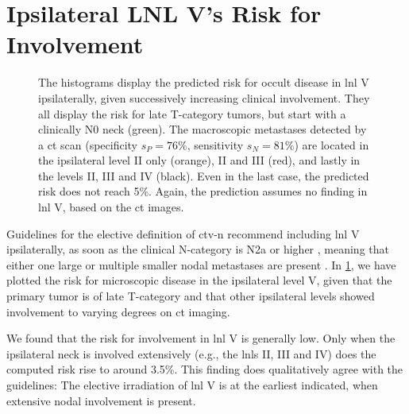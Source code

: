 \documentclass[\relativeRoot/main.tex]{subfiles}
\begin{document}
\section[Ipsilateral LNL V's Risk for Involvement]{Ipsilateral LNL V's Risk for Involvement}
\label{sec:complete:ipsiV}

\begin{figure}
    \centering
    \def\svgwidth{1.0\textwidth}
    
    \caption[
        Computed risks of involvement for ipsilateral LNL V
    ]{
        The histograms display the predicted risk for occult disease in \gls{lnl} V ipsilaterally, given successively increasing clinical involvement. They all display the risk for late T-category tumors, but start with a clinically N0 neck (green). The macroscopic metastases detected by a \gls{ct} scan (specificity $s_P = 76\%$, sensitivity $s_N = 81\%$) are located in the ipsilateral level II only (orange), II and III (red), and lastly in the levels II, III and IV (black). Even in the last case, the predicted risk does not reach 5\%. Again, the prediction assumes no finding in \gls{lnl} V, based on the \gls{ct} images.
    }
    \label{fig:complete:ipsiV}
\end{figure}

Guidelines for the elective definition of \gls{ctv-n} recommend including \gls{lnl} V ipsilaterally, as soon as the clinical N-category is N2a or higher \cite{biau_selection_2019}, meaning that either one large or multiple smaller nodal metastases are present \cite{brierley_tnm_2017}. In \cref{fig:complete:ipsiV}, we have plotted the risk for microscopic disease in the ipsilateral level V, given that the primary tumor is of late T-category and that other ipsilateral levels showed involvement to varying degrees on \gls{ct} imaging.

We found that the risk for involvement in \gls{lnl} V is generally low. Only when the ipsilateral neck is involved extensively (e.g., the \glspl{lnl} II, III and IV) does the computed risk rise to around 3.5\%. This finding does qualitatively agree with the guidelines: The elective irradiation of \gls{lnl} V is at the earliest indicated, when extensive nodal involvement is present.
\end{document}
